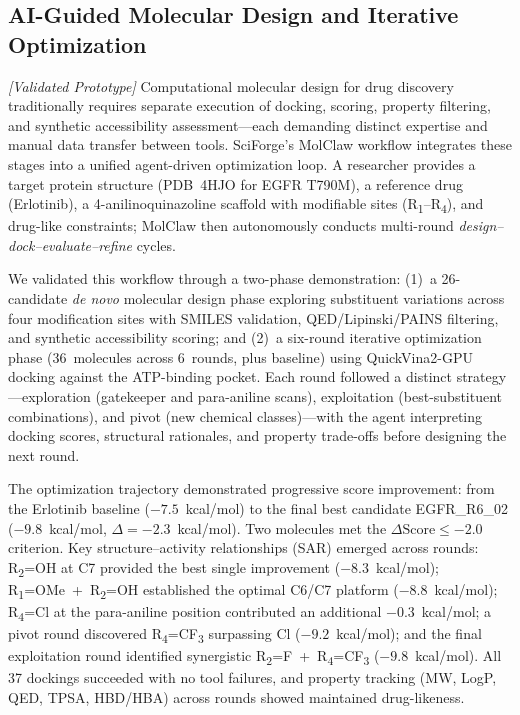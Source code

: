 \documentclass[sn-basic,Numbered,pdflatex]{sn-jnl}
\begin{document}
\subsection{AI-Guided Molecular Design and Iterative Optimization}

\textit{[Validated Prototype]} Computational molecular design for drug discovery traditionally requires separate execution of docking, scoring, property filtering, and synthetic accessibility assessment---each demanding distinct expertise and manual data transfer between tools. SciForge's MolClaw workflow integrates these stages into a unified agent-driven optimization loop. A researcher provides a target protein structure (PDB~4HJO for EGFR T790M), a reference drug (Erlotinib), a 4-anilinoquinazoline scaffold with modifiable sites (R\textsubscript{1}--R\textsubscript{4}), and drug-like constraints; MolClaw then autonomously conducts multi-round \emph{design--dock--evaluate--refine} cycles.

We validated this workflow through a two-phase demonstration: (1)~a 26-candidate \emph{de novo} molecular design phase exploring substituent variations across four modification sites with SMILES validation, QED/Lipinski/PAINS filtering, and synthetic accessibility scoring; and (2)~a six-round iterative optimization phase (36~molecules across 6~rounds, plus baseline) using QuickVina2-GPU docking against the ATP-binding pocket. Each round followed a distinct strategy---exploration (gatekeeper and para-aniline scans), exploitation (best-substituent combinations), and pivot (new chemical classes)---with the agent interpreting docking scores, structural rationales, and property trade-offs before designing the next round.

The optimization trajectory demonstrated progressive score improvement: from the Erlotinib baseline ($-7.5$~kcal/mol) to the final best candidate EGFR\_R6\_02 ($-9.8$~kcal/mol, $\Delta = -2.3$~kcal/mol). Two molecules met the $\Delta\text{Score} \leq -2.0$ criterion. Key structure--activity relationships (SAR) emerged across rounds: R\textsubscript{2}=OH at C7 provided the best single improvement ($-8.3$~kcal/mol); R\textsubscript{1}=OMe~+~R\textsubscript{2}=OH established the optimal C6/C7 platform ($-8.8$~kcal/mol); R\textsubscript{4}=Cl at the para-aniline position contributed an additional $-0.3$~kcal/mol; a pivot round discovered R\textsubscript{4}=CF\textsubscript{3} surpassing Cl ($-9.2$~kcal/mol); and the final exploitation round identified synergistic R\textsubscript{2}=F~+~R\textsubscript{4}=CF\textsubscript{3} ($-9.8$~kcal/mol). All 37 dockings succeeded with no tool failures, and property tracking (MW, LogP, QED, TPSA, HBD/HBA) across rounds showed maintained drug-likeness.
\end{document}
